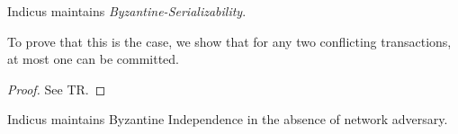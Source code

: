 \begin{theorem} 
Indicus maintains \textit{Byzantine-Serializability}.
\end{theorem}
To prove that this is the case, we show that for any two conflicting transactions, at most one can be committed.
\begin{proof}
See TR. 

\end{proof}

\begin{theorem} 
Indicus maintains Byzantine Independence in the absence of network adversary.
\end{theorem}

